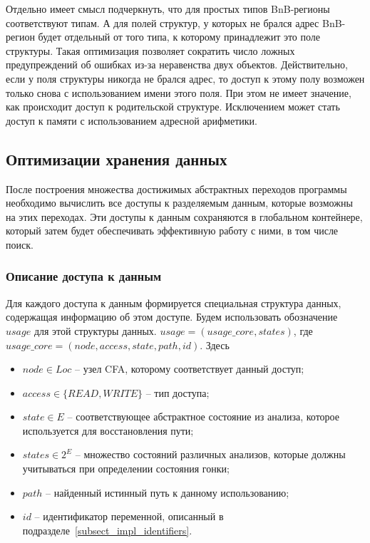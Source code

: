 Отдельно имеет смысл подчеркнуть, что для простых типов BnB-регионы соответствуют типам.
А для полей структур, у которых не брался адрес BnB-регион будет отдельный от того типа, к которому принадлежит это поле структуры.
Такая оптимизация позволяет сократить число ложных предупреждений об ошибках из-за неравенства двух объектов.
Действительно, если у поля структуры никогда не брался адрес, то доступ к этому полу возможен только снова с использованием имени этого поля.
При этом не имеет значение, как происходит доступ к родительской структуре.
Исключением может стать доступ к памяти с использованием адресной арифметики.


\subsection{Оптимизации хранения данных}
\label{subsect_impl_storage}

После построения множества достижимых абстрактных переходов программы необходимо вычислить все доступы к разделяемым данным, которые возможны на этих переходах.
Эти доступы к данным сохраняются в глобальном контейнере, который затем будет обеспечивать эффективную работу с ними, в том числе поиск.

\subsubsection{Описание доступа к данным}

Для каждого доступа к данным формируется специальная структура данных, содержащая информацию об этом доступе. 
Будем использовать обозначение $usage$ для этой структуры данных.
$usage = (usage\_core, states)$, где $usage\_core = (node, access, state, path, id)$. Здесь 

\begin{itemize}
\item $node \in Loc$ -- узел CFA, которому соответствует данный доступ;
\item $access \in \{READ, WRITE\}$ -- тип доступа;
\item $state \in E$ -- соответствующее абстрактное состояние из анализа, которое используется для восстановления пути;
\item $states \in 2^E$ -- множество состояний различных анализов, которые должны учитываться при определении состояния гонки;
\item $path$ -- найденный истинный путь к данному использованию;
\item $id$ -- идентификатор переменной, описанный в подразделе~\ref{subsect_impl_identifiers}.
\end{itemize}

